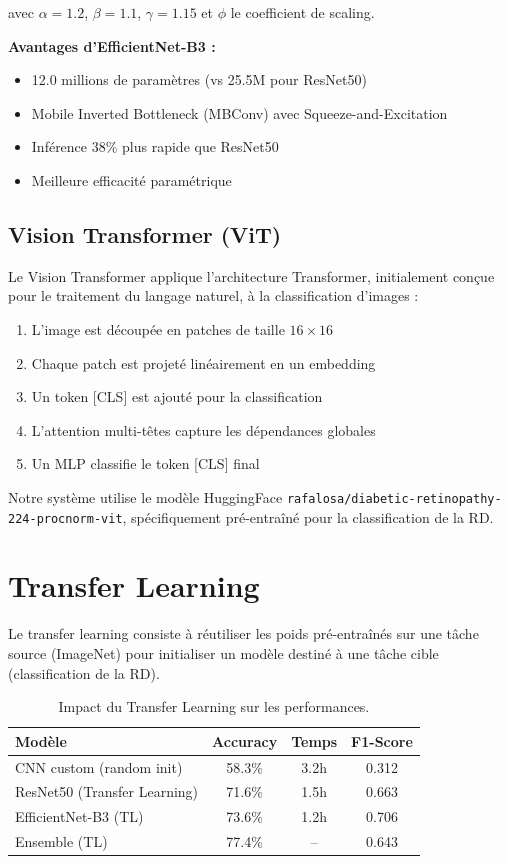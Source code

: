 \documentclass[12pt,a4paper,oneside]{report}
\begin{document}
avec $\alpha = 1.2$, $\beta = 1.1$, $\gamma = 1.15$ et $\phi$
le coefficient de scaling.

\textbf{Avantages d'EfficientNet-B3 :}
\begin{itemize}
    \item 12.0 millions de paramètres (vs 25.5M pour ResNet50)
    \item Mobile Inverted Bottleneck (MBConv) avec Squeeze-and-Excitation
    \item Inférence 38\% plus rapide que ResNet50
    \item Meilleure efficacité paramétrique
\end{itemize}

\subsection{Vision Transformer (ViT)}

Le Vision Transformer \cite{dosovitskiy2020image} applique l'architecture
Transformer, initialement conçue pour le traitement du langage naturel,
à la classification d'images :

\begin{enumerate}
    \item L'image est découpée en patches de taille $16\times16$
    \item Chaque patch est projeté linéairement en un embedding
    \item Un token [CLS] est ajouté pour la classification
    \item L'attention multi-têtes capture les dépendances globales
    \item Un MLP classifie le token [CLS] final
\end{enumerate}

Notre système utilise le modèle HuggingFace
\texttt{rafalosa/diabetic-retinopathy-224-procnorm-vit},
spécifiquement pré-entraîné pour la classification de la RD.

\section{Transfer Learning}

Le transfer learning consiste à réutiliser les poids pré-entraînés sur
une tâche source (ImageNet) pour initialiser un modèle destiné à une
tâche cible (classification de la RD).

\begin{table}[H]
\centering
\caption{Impact du Transfer Learning sur les performances.}
\label{tab:transfer_learning}
\begin{tabular}{|l|c|c|c|}
\hline
\textbf{Modèle} & \textbf{Accuracy} & \textbf{Temps} & \textbf{F1-Score} \\
\hline
CNN custom (random init) & 58.3\% & 3.2h & 0.312 \\
ResNet50 (Transfer Learning) & 71.6\% & 1.5h & 0.663 \\
EfficientNet-B3 (TL) & 73.6\% & 1.2h & 0.706 \\
Ensemble (TL) & 77.4\% & -- & 0.643 \\
\hline
\end{tabular}
\end{table}
\end{document}

